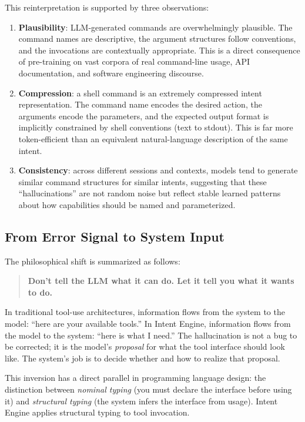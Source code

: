 \documentclass[11pt]{article}
\begin{document}
This reinterpretation is supported by three observations:

\begin{enumerate}[leftmargin=*]
  \item \textbf{Plausibility}: LLM-generated commands are overwhelmingly plausible. The command names are descriptive, the argument structures follow conventions, and the invocations are contextually appropriate. This is a direct consequence of pre-training on vast corpora of real command-line usage, API documentation, and software engineering discourse.

  \item \textbf{Compression}: a shell command is an extremely compressed intent representation. The command name encodes the desired action, the arguments encode the parameters, and the expected output format is implicitly constrained by shell conventions (text to stdout). This is far more token-efficient than an equivalent natural-language description of the same intent.

  \item \textbf{Consistency}: across different sessions and contexts, models tend to generate similar command structures for similar intents, suggesting that these ``hallucinations'' are not random noise but reflect stable learned patterns about how capabilities should be named and parameterized.
\end{enumerate}

\subsection{From Error Signal to System Input}

The philosophical shift is summarized as follows:

\begin{quote}
\textbf{Don't tell the LLM what it can do. Let it tell you what it wants to do.}
\end{quote}

In traditional tool-use architectures, information flows from the system to the model: ``here are your available tools.''
In Intent Engine, information flows from the model to the system: ``here is what I need.''
The hallucination is not a bug to be corrected; it is the model's \emph{proposal} for what the tool interface should look like.
The system's job is to decide whether and how to realize that proposal.

This inversion has a direct parallel in programming language design: the distinction between \emph{nominal typing} (you must declare the interface before using it) and \emph{structural typing} (the system infers the interface from usage).
Intent Engine applies structural typing to tool invocation.
\end{document}
